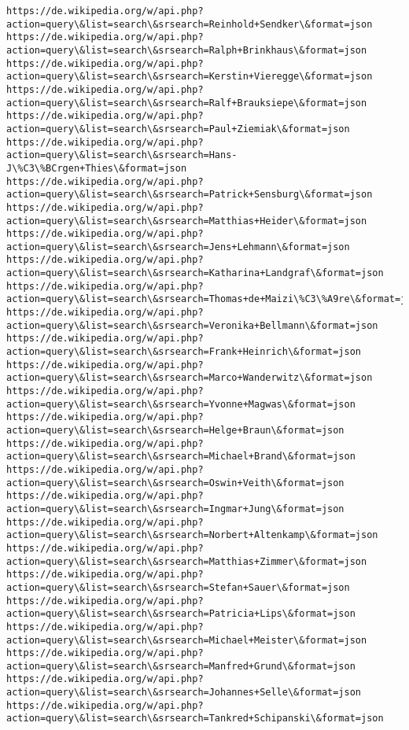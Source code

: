 \documentclass[11pt]{article}
\begin{document}
\begin{Verbatim}[commandchars=\\\{\}]
https://de.wikipedia.org/w/api.php?action=query\&list=search\&srsearch=Reinhold+Sendker\&format=json
https://de.wikipedia.org/w/api.php?action=query\&list=search\&srsearch=Ralph+Brinkhaus\&format=json
https://de.wikipedia.org/w/api.php?action=query\&list=search\&srsearch=Kerstin+Vieregge\&format=json
https://de.wikipedia.org/w/api.php?action=query\&list=search\&srsearch=Ralf+Brauksiepe\&format=json
https://de.wikipedia.org/w/api.php?action=query\&list=search\&srsearch=Paul+Ziemiak\&format=json
https://de.wikipedia.org/w/api.php?action=query\&list=search\&srsearch=Hans-J\%C3\%BCrgen+Thies\&format=json
https://de.wikipedia.org/w/api.php?action=query\&list=search\&srsearch=Patrick+Sensburg\&format=json
https://de.wikipedia.org/w/api.php?action=query\&list=search\&srsearch=Matthias+Heider\&format=json
https://de.wikipedia.org/w/api.php?action=query\&list=search\&srsearch=Jens+Lehmann\&format=json
https://de.wikipedia.org/w/api.php?action=query\&list=search\&srsearch=Katharina+Landgraf\&format=json
https://de.wikipedia.org/w/api.php?action=query\&list=search\&srsearch=Thomas+de+Maizi\%C3\%A9re\&format=json
https://de.wikipedia.org/w/api.php?action=query\&list=search\&srsearch=Veronika+Bellmann\&format=json
https://de.wikipedia.org/w/api.php?action=query\&list=search\&srsearch=Frank+Heinrich\&format=json
https://de.wikipedia.org/w/api.php?action=query\&list=search\&srsearch=Marco+Wanderwitz\&format=json
https://de.wikipedia.org/w/api.php?action=query\&list=search\&srsearch=Yvonne+Magwas\&format=json
https://de.wikipedia.org/w/api.php?action=query\&list=search\&srsearch=Helge+Braun\&format=json
https://de.wikipedia.org/w/api.php?action=query\&list=search\&srsearch=Michael+Brand\&format=json
https://de.wikipedia.org/w/api.php?action=query\&list=search\&srsearch=Oswin+Veith\&format=json
https://de.wikipedia.org/w/api.php?action=query\&list=search\&srsearch=Ingmar+Jung\&format=json
https://de.wikipedia.org/w/api.php?action=query\&list=search\&srsearch=Norbert+Altenkamp\&format=json
https://de.wikipedia.org/w/api.php?action=query\&list=search\&srsearch=Matthias+Zimmer\&format=json
https://de.wikipedia.org/w/api.php?action=query\&list=search\&srsearch=Stefan+Sauer\&format=json
https://de.wikipedia.org/w/api.php?action=query\&list=search\&srsearch=Patricia+Lips\&format=json
https://de.wikipedia.org/w/api.php?action=query\&list=search\&srsearch=Michael+Meister\&format=json
https://de.wikipedia.org/w/api.php?action=query\&list=search\&srsearch=Manfred+Grund\&format=json
https://de.wikipedia.org/w/api.php?action=query\&list=search\&srsearch=Johannes+Selle\&format=json
https://de.wikipedia.org/w/api.php?action=query\&list=search\&srsearch=Tankred+Schipanski\&format=json

\end{Verbatim}
\end{document}
